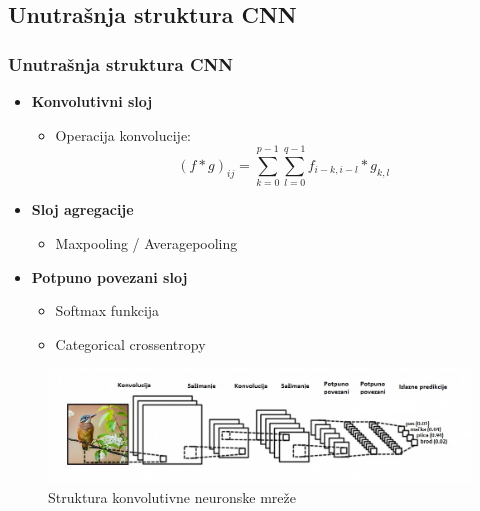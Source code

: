\documentclass{beamer}
\begin{document}
\subsection{Unutrašnja struktura CNN}
\begin{frame}
\frametitle{Unutrašnja struktura CNN}

\begin{itemize}
\item \textbf{Konvolutivni sloj}
\begin{itemize}
\item Operacija konvolucije: $$(f * g)_{ij} = \sum_{k=0}^{p-1} \sum_{l=0}^{q-1} f_{i-k, i-l}*g_{k, l}$$
\end{itemize}
\item \textbf{Sloj agregacije}
\begin{itemize}
\item Maxpooling / Averagepooling
\end{itemize}
\item \textbf{Potpuno povezani sloj}
\begin{itemize}
\item Softmax funkcija
\item Categorical crossentropy
\end{itemize}
\end{itemize}

\begin{figure}
\includegraphics[scale=0.5]{cnn_layers.jpg}
\caption{Struktura konvolutivne neuronske mreže}
\end{figure}

\end{frame}
\end{document}
